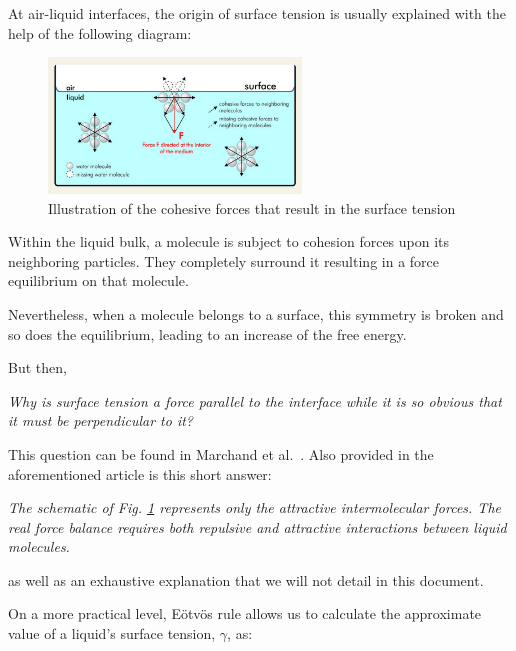 At air-liquid interfaces, the origin of surface tension is usually explained with the help of the following diagram:

\begin{figure}[H]
	\centering
	\includegraphics[width=0.6\textwidth]{archivos/surface_tension.png}
	\caption[Caption for LOF]{Illustration of the cohesive forces that result in the surface tension\protect\footnotemark~\cite{sita-process}}
	\label{surface_tension}
\end{figure}


Within the liquid bulk, a molecule is subject to cohesion forces upon its neighboring particles. They completely surround it resulting in a force equilibrium on that molecule.

Nevertheless, when a molecule belongs to a surface, this symmetry is broken and so does the equilibrium, leading to an increase of the free energy.

But then, 

\begin{displayquote}
	\textit{Why is surface tension a force parallel to the interface while it is so obvious that it must be perpendicular to it?}
\end{displayquote}

This question can be found in Marchand et al.~\cite{Marchand}. Also provided in the aforementioned article is this short answer:

\begin{displayquote}
	\textit{The schematic of Fig. \ref{surface_tension} represents only the attractive intermolecular forces. The real force balance requires both repulsive and attractive interactions between liquid molecules.}
\end{displayquote}

as well as an exhaustive explanation that we will not detail in this document.  

On a more practical level, E\"{o}tv\"{o}s rule allows us to calculate the approximate value of a liquid's surface tension, $\gamma$, as:


